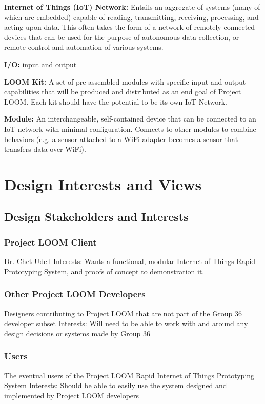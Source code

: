 \documentclass[onecolumn, draftclsnofoot,10pt, compsoc]{IEEEtran}
\begin{document}
\textbf{Internet of Things (IoT) Network:} Entails an aggregate of systems (many of which are embedded) capable of reading, transmitting, receiving, processing, and acting upon data. This often takes the form of a network of remotely connected devices that can be used for the purpose of autonomous data collection, or remote control and automation of various systems.

\textbf{I/O:} input and output

\textbf{LOOM Kit:} A set of pre-assembled modules with specific input and output capabilities that will be produced and distributed as an end goal of Project LOOM. Each kit should have the potential to be its own IoT Network. 

\textbf{Module:} An interchangeable, self-contained device that can be connected to an IoT network with minimal configuration. Connects to other modules to combine behaviors (e.g. a sensor attached to a WiFi adapter becomes a sensor that transfers data over WiFi).




\section{Design Interests and Views}
\subsection{Design Stakeholders and Interests}

\subsubsection{Project LOOM Client}
Dr. Chet Udell
Interests: Wants a functional, modular Internet of Things Rapid Prototyping System, and proofs of concept to demonstration it.

\subsubsection{Other Project LOOM Developers}
Designers contributing to Project LOOM that are not part of the Group 36 developer subset
Interests: Will need to be able to work with and around any design decisions or systems made by Group 36

\subsubsection{Users}
The eventual users of the Project LOOM Rapid Internet of Things Prototyping System
Interests: Should be able to easily use the system designed and implemented by Project LOOM developers
\end{document}
